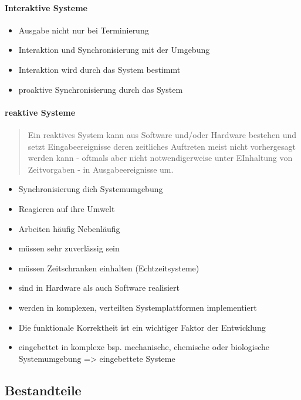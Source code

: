 \documentclass[
]{article}
\providecommand{\tightlist}{%
  \setlength{\itemsep}{0pt}\setlength{\parskip}{0pt}}
\begin{document}
\hypertarget{interaktive-systeme}{%
\paragraph{Interaktive Systeme}\label{interaktive-systeme}}

\begin{itemize}
\tightlist
\item
  Ausgabe nicht nur bei Terminierung
\item
  Interaktion und Synchronisierung mit der Umgebung
\item
  Interaktion wird durch das System bestimmt
\item
  proaktive Synchronisierung durch das System
\end{itemize}

\hypertarget{reaktive-systeme}{%
\paragraph{reaktive Systeme}\label{reaktive-systeme}}

\begin{quote}
Ein reaktives System kann aus Software und/oder Hardware bestehen und
setzt Eingabeereignisse deren zeitliches Auftreten meist nicht
vorhergesagt werden kann - oftmals aber nicht notwendigerweise unter
EInhaltung von Zeitvorgaben - in Ausgabeereignisse um.
\end{quote}

\begin{itemize}
\tightlist
\item
  Synchronisierung dich Systemumgebung
\item
  Reagieren auf ihre Umwelt
\item
  Arbeiten häufig Nebenläufig
\item
  müssen sehr zuverlässig sein
\item
  müssen Zeitschranken einhalten (Echtzeitsysteme)
\item
  sind in Hardware als auch Software realisiert
\item
  werden in komplexen, verteilten Systemplattformen implementiert
\item
  Die funktionale Korrektheit ist ein wichtiger Faktor der Entwicklung
\item
  eingebettet in komplexe bsp. mechanische, chemische oder biologische
  Systemumgebung =\textgreater{} eingebettete Systeme
\end{itemize}

\hypertarget{bestandteile}{%
\subsection{Bestandteile}\label{bestandteile}}
\end{document}
